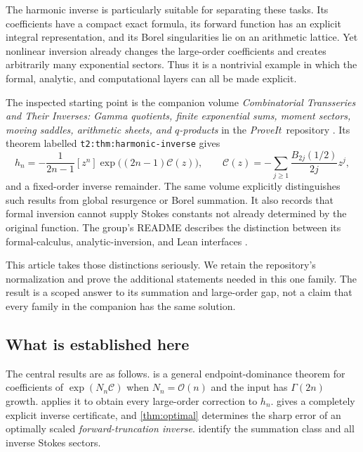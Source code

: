 \documentclass[11pt,a4paper]{article}
\theoremstyle{definition}
\numberwithin{equation}{section}
\newcommand{\coef}[2]{[#1^{#2}]}
\newcommand{\Oh}{\mathcal O}
\newcommand{\repo}{\textit{ProveIt}}
\newcommand{\cformal}{\mathscr C}
\begin{document}
The harmonic inverse is particularly suitable for separating these tasks. Its coefficients have a compact exact formula, its forward function has an explicit integral representation, and its Borel singularities lie on an arithmetic lattice. Yet nonlinear inversion already changes the large-order coefficients and creates arbitrarily many exponential sectors. Thus it is a nontrivial example in which the formal, analytic, and computational layers can all be made explicit.

The inspected starting point is the companion volume
\emph{Combinatorial Transseries and Their Inverses: Gamma quotients, finite exponential sums, moment sectors, moving saddles, arithmetic sheets, and $q$-products} in the \repo\ repository \cite{repo}. Its theorem labelled
\texttt{t2:thm:harmonic-inverse} gives
\begin{equation}
 h_n=-\frac{1}{2n-1}\coef{z}{n}
       \exp\bigl((2n-1)\cformal(z)\bigr),
 \qquad
 \cformal(z)=-\sum_{j\ge1}\frac{B_{2j}(1/2)}{2j}z^j,
 \label{eq:repo-coeff}
\end{equation}
and a fixed-order inverse remainder. The same volume explicitly distinguishes such results from global resurgence or Borel summation. It also records that formal inversion cannot supply Stokes constants not already determined by the original function. The group's README describes the distinction between its formal-calculus, analytic-inversion, and Lean interfaces \cite{reporeadme}.

This article takes those distinctions seriously. We retain the repository's normalization and prove the additional statements needed in this one family. The result is a scoped answer to its summation and large-order gap, not a claim that every family in the companion has the same solution.

\subsection{What is established here}
The central results are as follows.  is a general endpoint-dominance theorem for coefficients of $\exp(N_n\cformal)$ when $N_n=\Oh(n)$ and the input has $\Gamma(2n)$ growth.  applies it to obtain every large-order correction to $h_n$.  gives a completely explicit inverse certificate, and \cref{thm:optimal} determines the sharp error of an optimally scaled \emph{forward-truncation inverse}.  identify the summation class and all inverse Stokes sectors.
\end{document}
